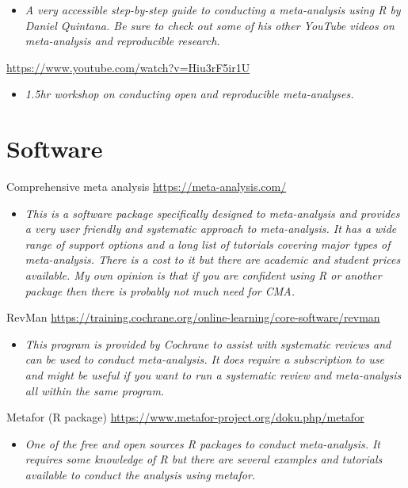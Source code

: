 \documentclass[
]{book}
\providecommand{\tightlist}{%
  \setlength{\itemsep}{0pt}\setlength{\parskip}{0pt}}
\begin{document}
\begin{itemize}
\tightlist
\item
  \emph{A very accessible step-by-step guide to conducting a meta-analysis using R by Daniel Quintana. Be sure to check out some of his other YouTube videos on meta-analysis and reproducible research. }
\end{itemize}

\url{https://www.youtube.com/watch?v=Hiu3rF5ir1U}

\begin{itemize}
\tightlist
\item
  \emph{1.5hr workshop on conducting open and reproducible meta-analyses.}
\end{itemize}

\section{Software}\label{software}

Comprehensive meta analysis \url{https://meta-analysis.com/}

\begin{itemize}
\tightlist
\item
  \emph{This is a software package specifically designed to meta-analysis and provides a very user friendly and systematic approach to meta-analysis. It has a wide range of support options and a long list of tutorials covering major types of meta-analysis. There is a cost to it but there are academic and student prices available. My own opinion is that if you are confident using R or another package then there is probably not much need for CMA. }
\end{itemize}

RevMan \url{https://training.cochrane.org/online-learning/core-software/revman}

\begin{itemize}
\tightlist
\item
  \emph{This program is provided by Cochrane to assist with systematic reviews and can be used to conduct meta-analysis. It does require a subscription to use and might be useful if you want to run a systematic review and meta-analysis all within the same program.}
\end{itemize}

Metafor (R package) \url{https://www.metafor-project.org/doku.php/metafor}

\begin{itemize}
\tightlist
\item
  \emph{One of the free and open sources R packages to conduct meta-analysis. It requires some knowledge of R but there are several examples and tutorials available to conduct the analysis using metafor.}
\end{itemize}
\end{document}
